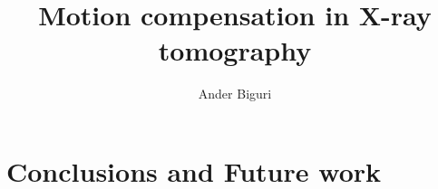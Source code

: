 \documentclass[11pt]{report}
\title{Motion compensation in X-ray tomography}
\author{Ander Biguri}
\begin{document}
\maketitle



\tableofcontents
\chapterfont{\titlecap}
\sectionfont{\titlecap}
\subsectionfont{\titlecap}
\subsubsectionfont{\titlecap}



\label{ch:rec}


\label{ch:apllications}

%
\chapter{Conclusions and Future work}\label{ch:conclusions}



\end{document}
